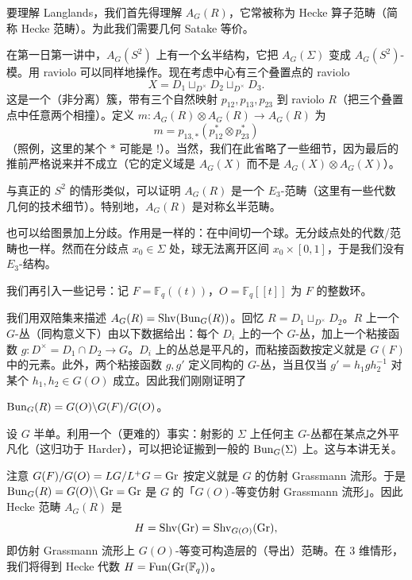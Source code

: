 要理解 Langlands，我们首先得理解 $A_G(R)$，它常被称为 Hecke 算子范畴（简称 Hecke 范畴）。为此我们需要几何 Satake 等价。

\begin{rem}
在第一日第一讲中，$A_G(S^2)$ 上有一个幺半结构，它把 $A_G(\Sigma)$ 变成 $A_G(S^2)$-模。用 raviolo 可以同样地操作。现在考虑中心有三个叠置点的 raviolo
\[
  X=D_1\sqcup_{D^\times}D_2\sqcup_{D^\times}D_3.
\]
这是一个（非分离）簇，带有三个自然映射 $p_{12},p_{13},p_{23}$ 到 raviolo $R$（把三个叠置点中任意两个相撞）。定义 $m:A_G(R)\otimes A_G(R)\to A_G(R)$ 为
\[
  m=p_{13,*}(p_{12}^*\otimes p_{23}^*)
\]
（照例，这里的某个 $*$ 可能是 $!$）。当然，我们在此省略了一些细节，因为最后的推前严格说来并不成立（它的定义域是 $A_G(X)$ 而不是 $A_G(X)\otimes A_G(X)$）。

与真正的 $S^2$ 的情形类似，可以证明 $A_G(R)$ 是一个 $E_3$-范畴（这里有一些代数几何的技术细节）。特别地，$A_G(R)$ 是对称幺半范畴。

也可以给图景加上分歧。作用是一样的：在中间切一个球。无分歧点处的代数/范畴也一样。然而在分歧点 $x_0\in\Sigma$ 处，球无法离开区间 $x_0\times[0,1]$，于是我们没有 $E_3$-结构。
\end{rem}

我们再引入一些记号：记 $F=\mathbb F_q((t))$，$O=\mathbb F_q[[t]]$ 为 $F$ 的整数环。

我们用双陪集来描述 $A_G(R)=\operatorname{Shv}(\operatorname{Bun}_G(R))$。回忆 $R=D_1\sqcup_{D^\times}D_2$。$R$ 上一个 $G$-丛（同构意义下）由以下数据给出：每个 $D_i$ 上的一个 $G$-丛，加上一个粘接函数 $g:D^\times=D_1\cap D_2\to G$。$D_i$ 上的丛总是平凡的，而粘接函数按定义就是 $G(F)$ 中的元素。此外，两个粘接函数 $g,g'$ 定义同构的 $G$-丛，当且仅当 $g'=h_1gh_2^{-1}$ 对某个 $h_1,h_2\in G(O)$ 成立。因此我们刚刚证明了

\begin{lem}
  $\operatorname{Bun}_G(R)=G(O)\backslash G(F)/G(O)$。
\end{lem}

\begin{rem}
设 $G$ 半单。利用一个（更难的）事实：射影的 $\Sigma$ 上任何主 $G$-丛都在某点之外平凡化（这归功于 Harder），可以把论证搬到一般的 $\operatorname{Bun}_G(\Sigma)$ 上。这与本讲无关。
\end{rem}

注意 $G(F)/G(O)=LG/L^+G=\operatorname{Gr}$ 按定义就是 $G$ 的仿射 Grassmann 流形。于是 $\operatorname{Bun}_G(R)=G(O)\backslash\operatorname{Gr}=\operatorname{Gr}$ 是 $G$ 的「$G(O)$-等变仿射 Grassmann 流形」。因此 Hecke 范畴 $A_G(R)$ 是
\[
  H=\operatorname{Shv}(\operatorname{Gr})=\operatorname{Shv}_{G(O)}(\operatorname{Gr}),
\]
即仿射 Grassmann 流形上 $G(O)$-等变可构造层的（导出）范畴。在 3 维情形，我们将得到 Hecke 代数 $H=\operatorname{Fun}(\operatorname{Gr}(\mathbb F_q))$。

